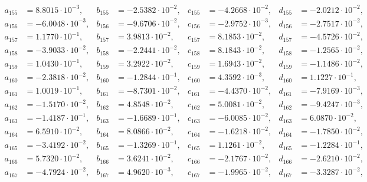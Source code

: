 \begin{align*}
  a_{ 155 } &= 8.8015 \cdot 10^{ -3 }, & b_{ 155 } &= -2.5382 \cdot 10^{ -2 }, & c_{ 155 } &= -4.2668 \cdot 10^{ -2 }, & d_{ 155 } &= -2.0212 \cdot 10^{ -2 }, \\ 
  a_{ 156 } &= -6.0048 \cdot 10^{ -3 }, & b_{ 156 } &= -9.6706 \cdot 10^{ -2 }, & c_{ 156 } &= -2.9752 \cdot 10^{ -3 }, & d_{ 156 } &= -2.7517 \cdot 10^{ -2 }, \\ 
  a_{ 157 } &= 1.1770 \cdot 10^{ -1 }, & b_{ 157 } &= 3.9813 \cdot 10^{ -2 }, & c_{ 157 } &= 8.1853 \cdot 10^{ -2 }, & d_{ 157 } &= -4.5726 \cdot 10^{ -2 }, \\ 
  a_{ 158 } &= -3.9033 \cdot 10^{ -2 }, & b_{ 158 } &= -2.2441 \cdot 10^{ -2 }, & c_{ 158 } &= 8.1843 \cdot 10^{ -2 }, & d_{ 158 } &= -1.2565 \cdot 10^{ -2 }, \\ 
  a_{ 159 } &= 1.0430 \cdot 10^{ -1 }, & b_{ 159 } &= 3.2922 \cdot 10^{ -2 }, & c_{ 159 } &= 1.6943 \cdot 10^{ -2 }, & d_{ 159 } &= -1.1486 \cdot 10^{ -2 }, \\ 
  a_{ 160 } &= -2.3818 \cdot 10^{ -2 }, & b_{ 160 } &= -1.2844 \cdot 10^{ -1 }, & c_{ 160 } &= 4.3592 \cdot 10^{ -3 }, & d_{ 160 } &= 1.1227 \cdot 10^{ -1 }, \\ 
  a_{ 161 } &= 1.0019 \cdot 10^{ -1 }, & b_{ 161 } &= -8.7301 \cdot 10^{ -2 }, & c_{ 161 } &= -4.4370 \cdot 10^{ -2 }, & d_{ 161 } &= -7.9169 \cdot 10^{ -3 }, \\ 
  a_{ 162 } &= -1.5170 \cdot 10^{ -2 }, & b_{ 162 } &= 4.8548 \cdot 10^{ -2 }, & c_{ 162 } &= 5.0081 \cdot 10^{ -2 }, & d_{ 162 } &= -9.4247 \cdot 10^{ -3 }, \\ 
  a_{ 163 } &= -1.4187 \cdot 10^{ -1 }, & b_{ 163 } &= -1.6689 \cdot 10^{ -1 }, & c_{ 163 } &= -6.0085 \cdot 10^{ -2 }, & d_{ 163 } &= 6.0870 \cdot 10^{ -2 }, \\ 
  a_{ 164 } &= 6.5910 \cdot 10^{ -2 }, & b_{ 164 } &= 8.0866 \cdot 10^{ -2 }, & c_{ 164 } &= -1.6218 \cdot 10^{ -2 }, & d_{ 164 } &= -1.7850 \cdot 10^{ -2 }, \\ 
  a_{ 165 } &= -3.4192 \cdot 10^{ -2 }, & b_{ 165 } &= -1.3269 \cdot 10^{ -1 }, & c_{ 165 } &= 1.1261 \cdot 10^{ -2 }, & d_{ 165 } &= -1.2284 \cdot 10^{ -1 }, \\ 
  a_{ 166 } &= 5.7320 \cdot 10^{ -2 }, & b_{ 166 } &= 3.6241 \cdot 10^{ -2 }, & c_{ 166 } &= -2.1767 \cdot 10^{ -2 }, & d_{ 166 } &= -2.6210 \cdot 10^{ -2 }, \\ 
  a_{ 167 } &= -4.7924 \cdot 10^{ -2 }, & b_{ 167 } &= 4.9620 \cdot 10^{ -3 }, & c_{ 167 } &= -1.9965 \cdot 10^{ -2 }, & d_{ 167 } &= -3.3287 \cdot 10^{ -2 }, \\ 

\end{align*}
